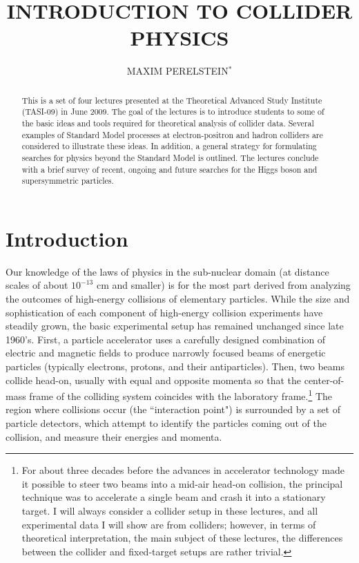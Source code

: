 \documentclass{ws-procs9x6}
\begin{document}
\title{INTRODUCTION TO COLLIDER PHYSICS}

\author{MAXIM PERELSTEIN$^*$}

\address{Newman Laboratory of Elementary Particle Physics\\
	     Cornell University, Ithaca, NY 14853, USA \\
	     E-mail: mp325@cornell.edu}


\begin{abstract}
This is a set of four lectures presented at the Theoretical Advanced Study Institute (TASI-09) in June 2009. The goal of the lectures is to introduce students to some of the basic ideas and tools required for theoretical analysis of collider data. Several examples of Standard Model processes at electron-positron and hadron colliders are considered to illustrate these ideas. In addition, a general strategy for formulating searches for physics beyond the Standard Model is outlined. The lectures conclude with a brief survey of recent, ongoing and future searches for the Higgs boson and supersymmetric particles.

\end{abstract}


\bodymatter

\section{Introduction}

Our knowledge of the laws of physics in the sub-nuclear domain 
(at distance scales of about $10^{-13}$ cm and smaller) is for the most part derived from analyzing the outcomes of high-energy collisions of elementary particles. While the size and sophistication of each component of high-energy collision experiments have steadily grown, the basic experimental setup has remained unchanged since late 1960's. First, a particle accelerator uses a carefully designed combination of electric and magnetic fields to produce narrowly focused beams of energetic particles (typically electrons, protons, and their antiparticles). Then, two beams collide head-on, usually with equal and opposite momenta so that the center-of-mass frame of the colliding system coincides with the laboratory frame.\footnote{For about three decades before the advances in accelerator technology made it possible to steer two beams into a mid-air head-on collision, the principal technique was to accelerate a single beam and crash it into a stationary target. I will always consider a collider setup in these lectures, and all experimental data I will show are from colliders; however, in terms of theoretical interpretation, the main subject of these lectures, the differences between the collider and fixed-target setups are rather trivial.} The region where collisions occur (the ``interaction point") is surrounded by a set of particle detectors, which attempt to identify the particles coming out of the collision, and measure their energies and momenta. 
\end{document}
